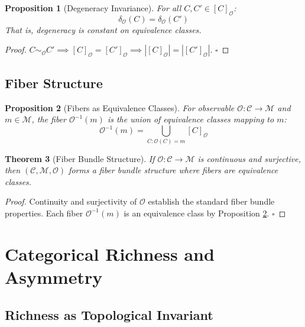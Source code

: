 \documentclass[12pt,a4paper]{article}
\newtheorem{theorem}{Theorem}[section]
\newtheorem{proposition}[theorem]{Proposition}
\begin{document}
\begin{proposition}[Degeneracy Invariance]
\label{prop:degeneracy_invariant}
For all $C, C' \in [C]_{\mathcal{O}}$:
\begin{equation}
\delta_{\mathcal{O}}(C) = \delta_{\mathcal{O}}(C')
\end{equation}
That is, degeneracy is constant on equivalence classes.
\end{proposition}

\begin{proof}
$C \sim_{\mathcal{O}} C' \implies [C]_{\mathcal{O}} = [C']_{\mathcal{O}} \implies |[C]_{\mathcal{O}}| = |[C']_{\mathcal{O}}|$. $\square$
\end{proof}

\subsection{Fiber Structure}

\begin{proposition}[Fibers as Equivalence Classes]
\label{prop:fibers}
For observable $\mathcal{O}: \mathcal{C} \to \mathcal{M}$ and $m \in \mathcal{M}$, the fiber $\mathcal{O}^{-1}(m)$ is the union of equivalence classes mapping to $m$:
\begin{equation}
\mathcal{O}^{-1}(m) = \bigcup_{C : \mathcal{O}(C) = m} [C]_{\mathcal{O}}
\end{equation}
\end{proposition}

\begin{theorem}[Fiber Bundle Structure]
\label{thm:fiber_bundle}
If $\mathcal{O}: \mathcal{C} \to \mathcal{M}$ is continuous and surjective, then $(\mathcal{C}, \mathcal{M}, \mathcal{O})$ forms a fiber bundle structure where fibers are equivalence classes.
\end{theorem}

\begin{proof}
Continuity and surjectivity of $\mathcal{O}$ establish the standard fiber bundle properties. Each fiber $\mathcal{O}^{-1}(m)$ is an equivalence class by Proposition \ref{prop:fibers}. $\square$
\end{proof}

\section{Categorical Richness and Asymmetry}

\subsection{Richness as Topological Invariant}
\end{document}
